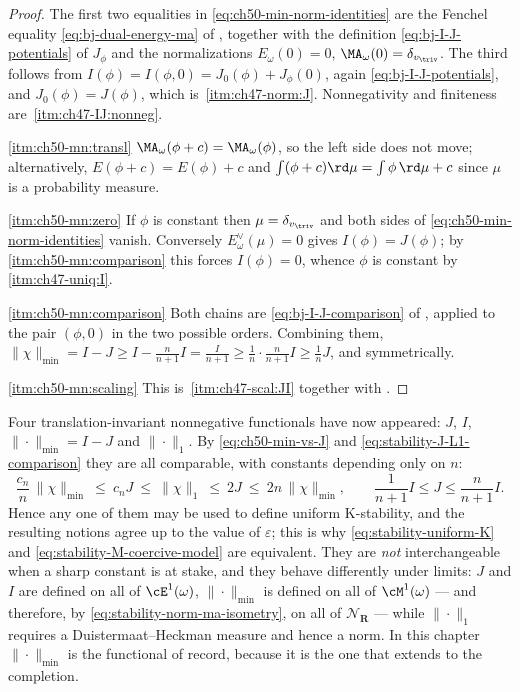 \begin{proof}
The first two equalities in \eqref{eq:ch50-min-norm-identities} are the
Fenchel equality \eqref{eq:bj-dual-energy-ma} of
, together with the definition
\eqref{eq:bj-I-J-potentials} of $J_\phi$ and the normalizations
$E_\omega(0)=0$, $\MA_\omega(0)=\delta_{v_{\triv}}$.  The third follows
from $I(\phi)=I(\phi,0)=J_0(\phi)+J_\phi(0)$, again
\eqref{eq:bj-I-J-potentials}, and
$J_0(\phi)=J(\phi)$, which is
\,\cref{itm:ch47-norm:J}.
Nonnegativity and finiteness are
\,\cref{itm:ch47-IJ:nonneg}.

\cref{itm:ch50-mn:transl}  $\MA_\omega(\phi+c)=\MA_\omega(\phi)$, so the
left side does not move; alternatively, $E(\phi+c)=E(\phi)+c$ and
$\int(\phi+c)\rd\mu=\int\phi\,\rd\mu+c$ since $\mu$ is a probability
measure.

\cref{itm:ch50-mn:zero}  If $\phi$ is constant then
$\mu=\delta_{v_{\triv}}$ and both sides of
\eqref{eq:ch50-min-norm-identities} vanish.  Conversely
$E^\vee_\omega(\mu)=0$ gives $I(\phi)=J(\phi)$; by
\cref{itm:ch50-mn:comparison} this forces $I(\phi)=0$, whence $\phi$ is
constant by \,\cref{itm:ch47-uniq:I}.

\cref{itm:ch50-mn:comparison}  Both chains are
\eqref{eq:bj-I-J-comparison} of , applied
to the pair $(\phi,0)$ in the two possible orders.  Combining them,
$\|\chi\|_{\min}=I-J\ge I-\frac n{n+1}I=\frac{I}{n+1}\ge\frac1n\cdot
\frac{n}{n+1}I\ge\frac1nJ$, and symmetrically.

\cref{itm:ch50-mn:scaling}  This is
\,\cref{itm:ch47-scal:JI} together with
.
\end{proof}

\begin{remark}
\label{rem:ch50-which-functional}
Four translation-invariant nonnegative functionals have now appeared:
$J$, $I$, $\|\cdot\|_{\min}=I-J$ and $\|\cdot\|_1$.  By
\eqref{eq:ch50-min-vs-J} and \eqref{eq:stability-J-L1-comparison} they are
all comparable, with constants depending only on $n$:
\[
 \frac{c_n}{n}\,\|\chi\|_{\min}\ \le\ c_nJ\ \le\ \|\chi\|_1
 \ \le\ 2J\ \le\ 2n\,\|\chi\|_{\min},
 \qquad
 \frac{1}{n+1}I\le J\le\frac{n}{n+1}I .
\]
Hence any one of them may be used to define uniform K-stability, and the
resulting notions agree up to the value of $\varepsilon$; this is why
\eqref{eq:stability-uniform-K} and \eqref{eq:stability-M-coercive-model}
are equivalent.  They are \emph{not} interchangeable when a sharp constant
is at stake, and they behave differently under limits: $J$ and $I$ are
defined on all of $\cE^1(\omega)$, $\|\cdot\|_{\min}$ is defined on all
of $\cM^1(\omega)$ --- and therefore, by
\eqref{eq:stability-norm-ma-isometry}, on all of
$\mathcal N_{\mathbf R}$ --- while $\|\cdot\|_1$ requires a
Duistermaat--Heckman measure and hence a norm.  In this chapter
$\|\cdot\|_{\min}$ is the functional of record, because it is the one
that extends to the completion.
\end{remark}

